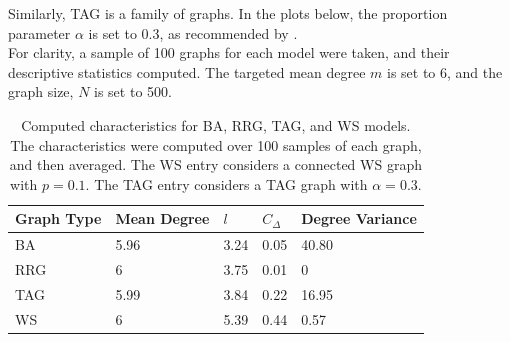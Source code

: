 Similarly, TAG is a family of graphs. In the plots below, the proportion parameter $\alpha$ is set to 0.3, as recommended by \cite{RN49}.\\

For clarity, a sample of 100 graphs for each model were taken, and their descriptive statistics computed. The targeted mean degree $m$ is set to 6, and the graph size, $N$ is set to 500. \\


\FloatBarrier

    

\begin{table}[!h]
\begin{center}
\begin{tabular}{|l|l|l|l|l|}
\hline
Graph Type & Mean Degree & $l$ & $C_\Delta$ & Degree Variance \\ \hline
BA         & 5.96        & 3.24                         & 0.05                   & 40.80           \\ \hline
RRG        & 6           & 3.75                         & 0.01                   & 0               \\ \hline
TAG        & 5.99        & 3.84                         & 0.22                   & 16.95           \\ \hline
WS         & 6           & 5.39                         & 0.44                   & 0.57            \\ \hline
\end{tabular}
\caption{Computed characteristics for BA, RRG, TAG, and WS models. The characteristics were computed over 100 samples of each graph, and then averaged. The WS entry considers a connected WS graph with $p=0.1$. The TAG entry considers a TAG graph with $\alpha = 0.3$. } \label{graph_stats}
\end{center}
\end{table}

\FloatBarrier

